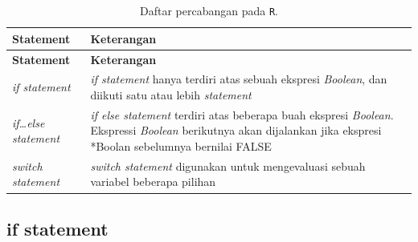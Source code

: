 \documentclass[]{book}
\begin{document}
\begin{longtable}[]{@{}ll@{}}
\caption{\label{tab:percabangan} Daftar percabangan pada
\texttt{R}.}\tabularnewline
\toprule
\begin{minipage}[b]{0.15\columnwidth}\raggedright\strut
\textbf{Statement}\strut
\end{minipage} & \begin{minipage}[b]{0.79\columnwidth}\raggedright\strut
\textbf{Keterangan}\strut
\end{minipage}\tabularnewline
\midrule
\endfirsthead
\toprule
\begin{minipage}[b]{0.15\columnwidth}\raggedright\strut
\textbf{Statement}\strut
\end{minipage} & \begin{minipage}[b]{0.79\columnwidth}\raggedright\strut
\textbf{Keterangan}\strut
\end{minipage}\tabularnewline
\midrule
\endhead
\begin{minipage}[t]{0.15\columnwidth}\raggedright\strut
\emph{if statement}\strut
\end{minipage} & \begin{minipage}[t]{0.79\columnwidth}\raggedright\strut
\emph{if statement} hanya terdiri atas sebuah ekspresi \emph{Boolean},
dan diikuti satu atau lebih \emph{statement}\strut
\end{minipage}\tabularnewline
\begin{minipage}[t]{0.15\columnwidth}\raggedright\strut
\emph{if\ldots{}else statement}\strut
\end{minipage} & \begin{minipage}[t]{0.79\columnwidth}\raggedright\strut
\emph{if else statement} terdiri atas beberapa buah ekspresi
\emph{Boolean}. Ekspressi \emph{Boolean} berikutnya akan dijalankan jika
ekspresi *Boolan sebelumnya bernilai FALSE\strut
\end{minipage}\tabularnewline
\begin{minipage}[t]{0.15\columnwidth}\raggedright\strut
\emph{switch statement}\strut
\end{minipage} & \begin{minipage}[t]{0.79\columnwidth}\raggedright\strut
\emph{switch statement} digunakan untuk mengevaluasi sebuah variabel
beberapa pilihan\strut
\end{minipage}\tabularnewline
\bottomrule
\end{longtable}

\subsection{if statement}\label{if-statement}
\end{document}
